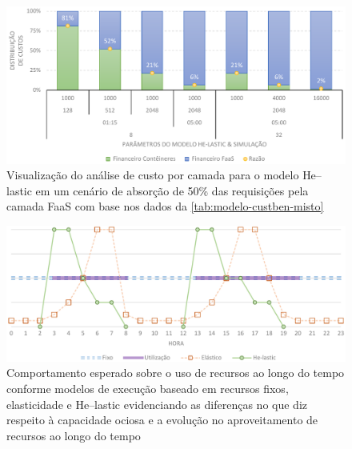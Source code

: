 \documentclass[english,brazilian]{UNISINOSmonografia} %
\newcommand\defaultFigureWidth{0.9}
\begin{document}
\begin{figure}[tb]
	\centering%
	\begin{minipage}{\defaultFigureWidth\textwidth}
		\caption[Visualização do análise de custo por camada para o modelo \textsf{He}--lastic em um cenário de absorção de 50\% das requisições pela camada FaaS]{Visualização do análise de custo por camada para o modelo \textsf{He}--lastic em um cenário de absorção de 50\% das requisições pela camada FaaS com base nos dados da \autoref{tab:modelo-custben-misto}}
		\label{fig:modelo-custben-misto}
		\vspace{1ex}
		\includegraphics[width=\textwidth]{modelo-custben-misto}
	\end{minipage}
\end{figure}


\begin{figure}[tb]
	\centering%
	\begin{minipage}{\defaultFigureWidth\textwidth}
		\caption{Comportamento esperado sobre o uso de recursos ao longo do tempo conforme modelos de execução baseado em recursos fixos, elasticidade e \textsf{He}--lastic evidenciando as diferenças no que diz respeito à capacidade ociosa e a evolução no aproveitamento de recursos ao longo do tempo}
		\label{fig:modelo-custben-alternativas}
		\includegraphics[width=\textwidth]{modelo-custben-alternativas}
	\end{minipage}
\end{figure}
\end{document}

